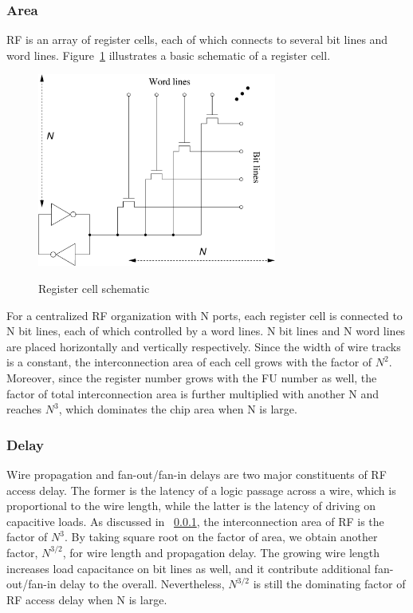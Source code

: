 \documentclass[12pt]{article}
\begin{document}
\begin{CJK}{UTF8}{bkai}
    \subsubsection{Area}
    \label{sec:area}
    RF is an array of register cells, each of which connects to several bit lines and word lines.
    Figure~\ref{fig:rf} illustrates a basic schematic of a register cell.
        \begin{figure}[!ht] 
            \caption{Register cell schematic}
            \centering
            \includegraphics[width=0.7\textwidth]{./figs/rf.eps}
            \label{fig:rf}
        \end{figure}
    For a centralized RF organization with N ports, 
    each register cell is connected to N bit lines, each of which controlled by a word lines.
    N bit lines and N word lines are placed horizontally and vertically respectively.
    Since the width of wire tracks is a constant, 
    the interconnection area of each cell grows with the factor of $N^2$.
    Moreover, since the register number grows with the FU number as well,
    the factor of total interconnection area is further multiplied with another N and reaches $N^3$,  
    which dominates the chip area when N is large.
    \subsubsection{Delay}
    Wire propagation and fan-out/fan-in delays are two major constituents of RF access delay.
    The former is the latency of a logic passage across a wire,
    which is proportional to the wire length, 
    while the latter is the latency of driving on capacitive loads.
    As discussed in ~\ref{sec:area}, the interconnection area of RF is the factor of $N^3$.
    By taking square root on the factor of area, 
    we obtain another factor, $N^{3/2}$, for wire length and propagation delay.
    The growing wire length increases load capacitance on bit lines as well, 
    and it contribute additional fan-out/fan-in delay to the overall.
    Nevertheless, $N^{3/2}$ is still the dominating factor of RF access delay when N is large.

\end{CJK}
\end{document}
